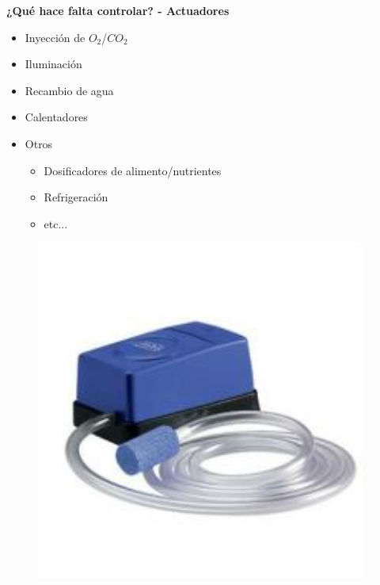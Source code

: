 \documentclass{beamer}
\begin{document}
\begin{frame}{\textbf{¿Qué hace falta controlar? - Actuadores}}
\fontsize{14pt}{15}\selectfont
\begin{minipage}[c]{1.0\linewidth}
\begin{minipage}[c]{0.6\linewidth}
      \centering
	\begin{itemize}
		\item Inyección de $O_2$/$CO_2$
		\vspace{10px}
		\item Iluminación
		\vspace{10px}
		\item Recambio de agua
		\vspace{10px}
		\item Calentadores
		\vspace{10px}
		\item Otros
			\begin{itemize}
				\item Dosificadores de alimento/nutrientes
				\item Refrigeración
				\item etc...
			\end{itemize}
	\end{itemize}
 \end{minipage}
  \begin{minipage}[c]{0.35\linewidth}
	\begin{figure}[H]
		{\includegraphics[width=1\textwidth]{./imagenes/actuador_pump}\vspace{5px}}

\end{figure}
\end{minipage}
\end{minipage}
\end{frame}
\end{document}
